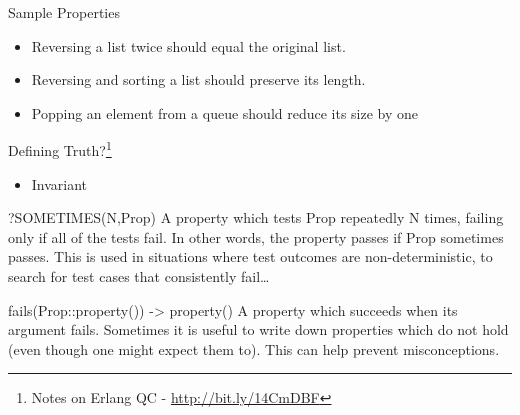 \documentclass[presentation, bigger]{beamer}
\begin{document}
\begin{frame}[label=sec-]{Sample Properties\footnotemark[3]{}}
\begin{itemize}
\item Reversing a list twice should equal the original list.
\item Reversing and sorting a list should preserve its length.
\item Popping an element from a queue should reduce its size by one
\end{itemize}
\end{frame}
\begin{frame}[label=sec-]{Defining Truth?\footnote{Notes on Erlang QC - \url{http://bit.ly/14CmDBF}}}
\begin{itemize}
\item Invariant
\end{itemize}
\begin{block}{?SOMETIMES(N,Prop)}
A property which tests Prop repeatedly N times, failing only if all of the
tests fail. In other words, the property passes if Prop sometimes passes. This
is used in situations where test outcomes are non-deterministic, to search for
test cases that consistently fail\ldots{}
\end{block}

\begin{block}{fails(Prop::property()) -> property()}
A property which succeeds when its argument fails. Sometimes it is useful to
write down properties which do not hold (even though one might expect them to).
This can help prevent misconceptions.
\end{block}
\end{frame}
\end{document}
